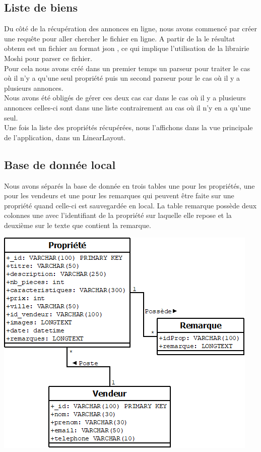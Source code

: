 \documentclass[a4paper,12pt]{article} %
\begin{document}
\subsection{Liste de biens}
Du côté de la récupération des annonces en ligne, nous avons commencé par créer une requête pour aller chercher le fichier en ligne.
A partir de la le résultat obtenu est un fichier au format json , ce qui implique l'utilisation de la librairie Moshi pour parser ce fichier. \\
Pour cela nous avons créé dans un premier temps un parseur pour traiter le cas où il n'y a qu'une seul propriété puis un second parseur pour le cas où il y a plusieurs annonces.\\
Nous avons été obligés de gérer ces deux cas car dans le cas où il y a plusieurs annonces celles-ci sont dans une liste contrairement au cas où il n'y en a qu'une seul.\\
Une fois la liste des propriétés récupérées, nous l'affichons dans la vue principale de l'application, dans un LinearLayout.

\subsection{Base de donnée local}
Nous avons séparés la base de donnée en trois tables une pour les propriétés, une pour les vendeurs et une pour les remarques qui peuvent être faite sur une propriété quand celle-ci est sauvegardée en local. La table remarque possède deux colonnes une avec l'identifiant de la propriété sur laquelle elle repose et la deuxième sur le texte que contient la remarque.

\begin{center}
\includegraphics[scale=0.5]{images/bdd.png}
\end{center}
\end{document}
